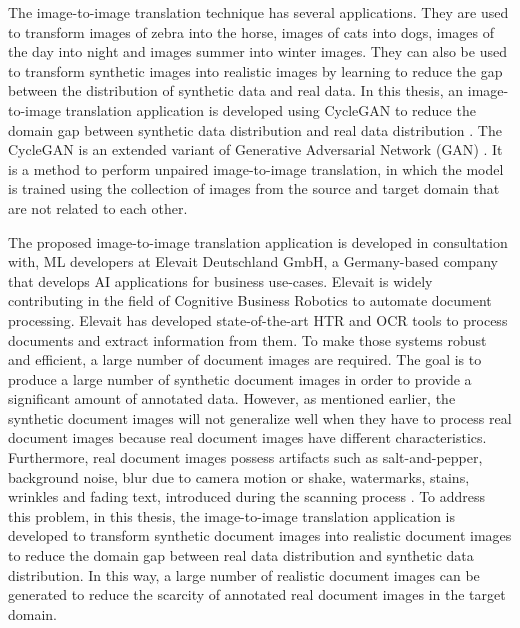 The image-to-image translation technique has several applications. They are used to transform images of zebra into the horse, images of cats into dogs, images of the day into night and images summer into winter images. They can also be used to transform synthetic images into realistic images by learning to reduce the gap between the distribution of synthetic data and real data. In this thesis, an image-to-image translation application is developed using \ac{CycleGAN} to reduce the domain gap between synthetic data distribution and real data distribution \cite{zhu2020unpaired}. The \ac{CycleGAN} is an extended variant of Generative Adversarial Network (\ac{GAN}) \cite{goodfellow2014generative}. It is a method to perform unpaired image-to-image translation, in which the model is trained using the collection of images from the source and target domain that are not related to each other\footnotemark.

The proposed image-to-image translation application is developed in consultation with, \ac{ML} developers at Elevait Deutschland GmbH, a Germany-based company that develops \ac{AI} applications for business use-cases. Elevait is widely contributing in the field of Cognitive Business Robotics \cite{Metta2012} to automate document processing. Elevait has developed state-of-the-art \ac{HTR} and \ac{OCR} tools to process documents and extract information from them. To make those systems robust and efficient, a large number of document images are required. The goal is to produce a large number of synthetic document images in order to provide a significant amount of annotated data. However, as mentioned earlier, the synthetic document images will not generalize well when they have to process real document images because real document images have different characteristics. Furthermore, real document images possess artifacts such as salt-and-pepper, background noise, blur due to camera motion or shake, watermarks, stains, wrinkles and fading text, introduced during the scanning process \cite{sharma2019learning}. To address this problem, in this thesis, the image-to-image translation application is developed to transform synthetic document images into realistic document images to reduce the domain gap between real data distribution and synthetic data distribution. In this way, a large number of realistic document images can be generated to reduce the scarcity of annotated real document images in the target domain.


